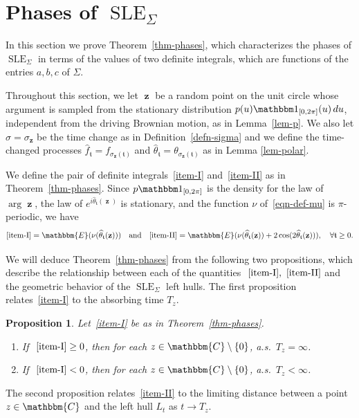 \documentclass[11pt]{article}
\theoremstyle{plain}
\newtheorem{prop}[thm]{Proposition}
\theoremstyle{definition}
\numberwithin{equation}{section}
\newcommand{\eqb}{\begin{equation}}
\newcommand{\eqe}{\end{equation}}
\newcommand{\BB}{\mathbbm}
\newcommand{\op}{\operatorname}
\newcommand{\rta}{\rightarrow}
\newcommand{\wh}{\widehat}
\newcommand{\SLEG}{{\operatorname{SLE}}_\Sigma}
\newcommand{\zz}{{\op{\mathbf{z}}}}
\newcommand{\tz}{{\mathfrak t}}
\begin{document}
\section{Phases of $\SLEG$}
\label{sec-phases}

In this section we prove Theorem~\ref{thm-phases}, which characterizes the phases of $\SLEG$ in terms of the values of two definite integrals, which are functions of the entries $a,b,c$ of $\Sigma$. 

Throughout this section, we let $\zz$ be a random point on the unit circle whose argument is sampled from the stationary distribution $p(u) \BB 1_{[0,2\pi]}(u)\,du$, independent from the driving Brownian motion, as in Lemma~\ref{lem-p}. We also let $\sigma= \sigma_\zz$ be the time change as in Definition~\ref{defn-sigma} and we define the time-changed processes $\wh f_{\tz} = f_{\sigma_{\zz}(\tz)}$ and $\wh\theta_{\tz} = \theta_{\sigma_{\zz}(\tz)}$ as in Lemma \ref{lem-polar}.

We define the pair of definite integrals~\ref{item-I} and~\ref{item-II} as in Theorem~\ref{thm-phases}. Since $p \BB 1_{[0,2\pi]}$ is the density for the law of $\arg \zz$, the law of $e^{i\wh\theta_\tz(\zz)}$ is stationary, and the function $\nu$ of~\eqref{eqn-def-mu} is $\pi$-periodic, we have 
\eqb \label{eqn-integral-nu}
\ref{item-I}  = \BB{E}(\nu(\wh \theta_\tz(\zz))) \quad\text{and} \quad
\ref{item-II} = \BB{E}(\nu(\wh \theta_\tz(\zz)) + 2 \cos(2\wh \theta_\tz(\zz))) ,\quad\forall \tz \geq 0. 
\eqe  

We will deduce Theorem~\ref{thm-phases} from the following two propositions, which describe the relationship between each of the quantities $~\ref{item-I},~\ref{item-II}$  and the geometric behavior of the $\SLEG$ left hulls.  The first proposition relates~\ref{item-I} to the absorbing time $T_z$.

\begin{prop} 
\label{prop-i} Let~\ref{item-I} be as in Theorem~\ref{thm-phases}.
\begin{enumerate}[label=(\alph*)]
\item If $~\ref{item-I} \geq 0$, then for each $z \in \BB{C} \setminus \{0\} $, a.s.\ $T_z = \infty$.  
\item If $~\ref{item-I} < 0$, then for each $z \in \BB{C} \setminus \{0\} $, a.s.\ $T_z < \infty$.  
\end{enumerate}
\end{prop}

The second proposition relates~\ref{item-II}  to the limiting distance between a point $z \in \BB{C}$ and the left hull $L_t$ as $t \rta T_z$.
\end{document}
